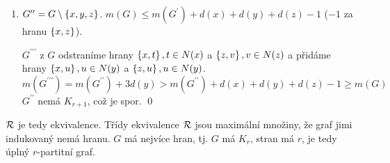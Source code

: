 \begin{enumerate}[1)]
\begin{figure}[H]
        \end{figure}
        \textcolor{black!30!yellow}{Neighbourhood} $N(v) = \bc{u \mid \bc{u,v} \in E}$. \\ \textcolor{black!30!green}{Z 
        $G$ odstraníme hrany $\bc{y,t}, t \in N(y)$ a přidáme $\bc{y,u}, u \in N(x)$. Tím dostaneme $G^\prime$, to má 
        více hran jak $G$.} \\
        $G^\prime$ nemá $K_{r+1}$, protože ani původní graf nebyl $K_{r+1}$. Což je spor.
        \hspace{\fill}\qed
    \item $G^{\prime \prime} = G \setminus \left\lbrace x,y,z \right\rbrace$. $m(G) \leq m(G^\prime) + d(x) + d(y) + d(z) - 1$ ($-1$ za hranu 
        $\left\lbrace x,z \right\rbrace$).
        \begin{figure}[H]
            \centering
        \end{figure}
        $G^{\prime \prime \prime}$ z $G$ odstraníme hrany $\left\lbrace x,t \right\rbrace, t \in N(x)$ a $\left\lbrace z,v \right\rbrace, v \in N(z)$ a přidáme 
        hrany $\left\lbrace x,u \right\rbrace, u \in N(y)$ a $\left\lbrace z,u \right\rbrace, u \in N(y)$.
        \begin{equation*}
            m(G^{\prime \prime \prime}) = m(G^{\prime \prime}) + 3d(y) > m(G^{\prime \prime}) + d(x) + d(y) + d(z) - 1
            \geq m(G)
        \end{equation*}
        $G^{\prime \prime}$ nemá $K_{r+1}$, což je spor.
        \hspace{\fill}\qed
\end{enumerate}
$\mathcal{R}$ je tedy ekvivalence. Třídy ekvivalence $\mathcal{R}$ jsou maximální množiny, že graf jimi indukovaný nemá hranu. $G$ má 
nejvíce hran, tj. $G$ má $K_r$, stran má $r$, je tedy úplný $r$-partitní graf.

